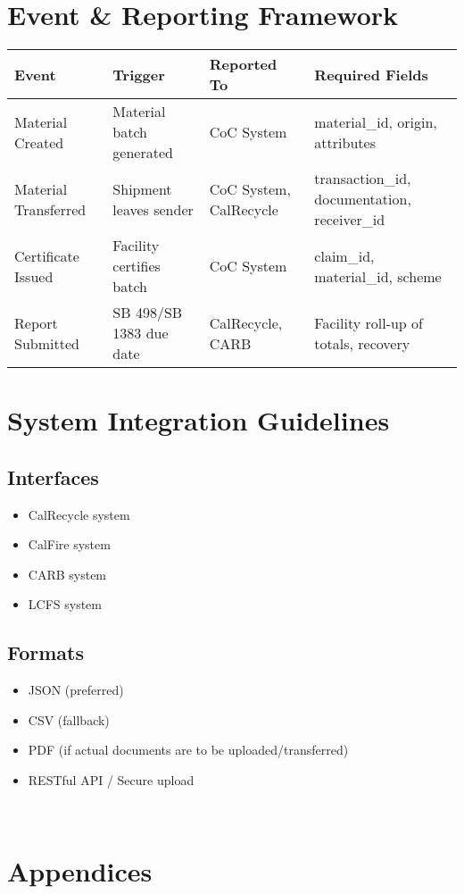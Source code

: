 \documentclass{article}
\begin{document}
\section{Event \& Reporting Framework}
\begin{longtable}{|p{4cm}|p{4cm}|p{4cm}|p{4cm}|}
\hline
\textbf{Event} & \textbf{Trigger} & \textbf{Reported To} & \textbf{Required Fields} \\
\hline
Material Created & Material batch generated & CoC System & material\_id, origin, attributes \\
Material Transferred & Shipment leaves sender & CoC System, CalRecycle & transaction\_id, documentation, receiver\_id \\
Certificate Issued & Facility certifies batch & CoC System & claim\_id, material\_id, scheme \\
Report Submitted & SB 498/SB 1383 due date & CalRecycle, CARB & Facility roll-up of totals, recovery \\
\hline
\end{longtable}

\section{System Integration Guidelines}
\subsection*{Interfaces}
\begin{itemize}[noitemsep]
    \item CalRecycle system
    \item CalFire system
    \item CARB system
    \item LCFS system
\end{itemize}

\subsection*{Formats}
\begin{itemize}[noitemsep]
    \item JSON (preferred)
    \item CSV (fallback)
    \item PDF (if actual documents are to be uploaded/transferred)
    \item RESTful API / Secure upload
\end{itemize}

\
\section{Appendices}
\end{document}
